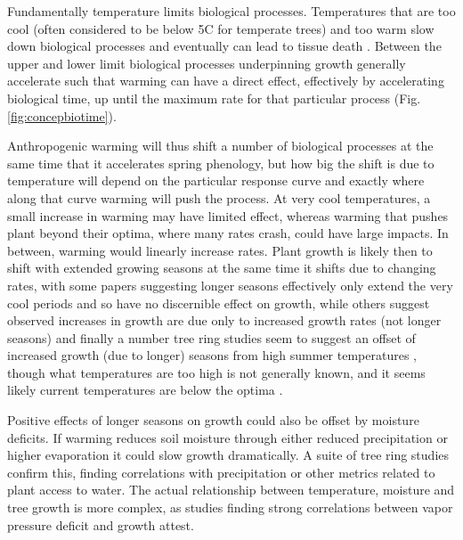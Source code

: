 \documentclass[11pt]{article}
\begin{document}
Fundamentally temperature limits biological processes. Temperatures that are too cool (often considered to be below 5\degree C for temperate trees) and too warm \citep[an area of active research][see also Fig. \ref{fig:temperaturecomplex}]{martinez2008hot,cabon2022cross} slow down biological processes and eventually can lead to tissue death \citep{larcher1980,kramer2012book}. Between the upper and lower limit biological processes underpinning growth generally accelerate such that warming can have a direct effect, effectively by accelerating biological time, up until the maximum rate for that particular process (Fig. \ref{fig:concepbiotime}).

Anthropogenic warming will thus shift a number of biological processes at the same time that it accelerates spring phenology, but how big the shift is due to temperature will depend on the particular response curve and exactly where along that curve warming will push the process. At very cool temperatures, a small increase in warming may have limited effect, whereas warming that pushes plant beyond their optima, where many rates crash, could have large impacts. In between, warming would linearly increase rates. Plant growth is likely then to shift with extended growing seasons at the same time it shifts due to changing rates, with some papers suggesting longer seasons effectively only extend the very cool periods and so have no discernible effect on growth, while others suggest observed increases in growth are due only to increased growth rates (not longer seasons) and finally a number tree ring studies seem to suggest an offset of increased growth (due to longer) seasons from high summer temperatures \citep{gantois2022new,dow2022warm}, though what temperatures are too high is not generally known, and it seems likely current temperatures are below the optima \citep{schaber2002evaluation}. 

Positive effects of longer seasons on growth could also be offset by moisture deficits. If warming reduces soil moisture through either reduced precipitation or higher evaporation it could slow growth dramatically. A suite of tree ring studies confirm this, finding correlations with precipitation or other metrics related to plant access to water. The actual relationship between temperature, moisture and tree growth is more complex, as studies finding strong correlations between vapor pressure deficit and growth attest. 
\end{document}
